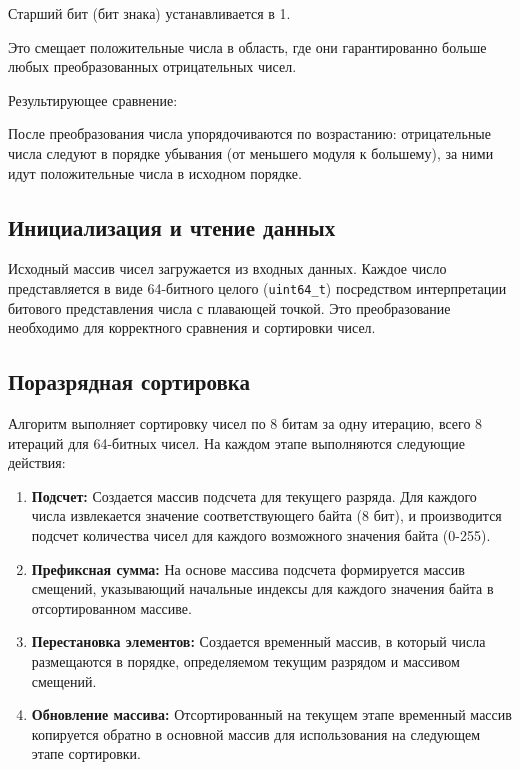 \documentclass[a4paper,12pt]{article}
\begin{document}
    Старший бит (бит знака) устанавливается в 1.

    Это смещает положительные числа в область, где они гарантированно больше любых преобразованных отрицательных чисел.

Результирующее сравнение:

После преобразования числа упорядочиваются по возрастанию: отрицательные числа следуют в порядке убывания (от меньшего модуля к большему), за ними идут положительные числа в исходном порядке.

\subsection{Инициализация и чтение данных}

Исходный массив чисел загружается из входных данных. Каждое число представляется в виде 64-битного целого (\texttt{uint64\_t}) посредством интерпретации битового представления числа с плавающей точкой. Это преобразование необходимо для корректного сравнения и сортировки чисел.

\subsection{Поразрядная сортировка}

Алгоритм выполняет сортировку чисел по 8 битам за одну итерацию, всего 8 итераций для 64-битных чисел. На каждом этапе выполняются следующие действия:

\begin{enumerate}
    \item \textbf{Подсчет:} Создается массив подсчета для текущего разряда. Для каждого числа извлекается значение соответствующего байта (8 бит), и производится подсчет количества чисел для каждого возможного значения байта (0-255).
    \item \textbf{Префиксная сумма:} На основе массива подсчета формируется массив смещений, указывающий начальные индексы для каждого значения байта в отсортированном массиве.
    \item \textbf{Перестановка элементов:} Создается временный массив, в который числа размещаются в порядке, определяемом текущим разрядом и массивом смещений.
    \item \textbf{Обновление массива:} Отсортированный на текущем этапе временный массив копируется обратно в основной массив для использования на следующем этапе сортировки.
\end{enumerate}
\end{document}
